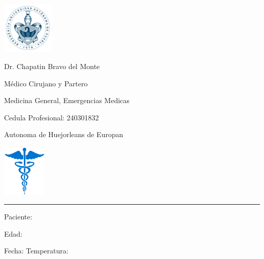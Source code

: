 \documentclass[landscape]{article}
\begin{document}

\includegraphics[height=2.5cm,keepaspectratio]{buapLogo.png}
\hfill
\begin{minipage}[b]{0.5\linewidth}
\setlength{\parindent}{0pt}
\begin{center}
Dr. Chapatin Bravo del Monte

Médico Cirujano y Partero

Medicina General, Emergencias Medicas

Cedula Profesional: 240301832

Autonoma de Huejorleans de Europan
\end{center}
\end{minipage}
\hfill
\includegraphics[height=2.5cm,keepaspectratio]{medicalLogo.png}
\vspace{1em}
\hrule
\vspace{1em}
\begin{multicols}{2}
Paciente:

Edad:

Fecha:
\vfill
\hfill Temperatura:
\end{multicols}
\end{document}
